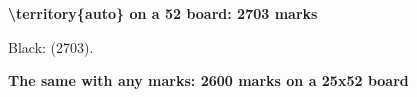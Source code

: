 \documentclass{article}
\newcommand\case[1]{\par\medskip\noindent\textbf{#1}\par\nopagebreak}
\begin{document}

\case{\textbackslash territory\{auto\} on a 52 board: 2703 marks}
\begin{goban}[52, scale = 0.12]\end{goban}
Black:  (2703).

\case{The same with any marks: 2600 marks on a 25x52 board}
\begin{goban}[25x52, scale = 0.12]\end{goban}
\end{document}
